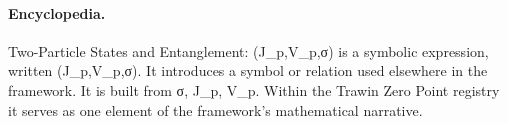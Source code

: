 \paragraph{Encyclopedia.}
Two-Particle States and Entanglement: (J\_p,V\_p,σ) is a symbolic expression, written (J\_p,V\_p,σ). It introduces a symbol or relation used elsewhere in the framework. It is built from σ, J\_p, V\_p. Within the Trawin Zero Point registry it serves as one element of the framework's mathematical narrative.

